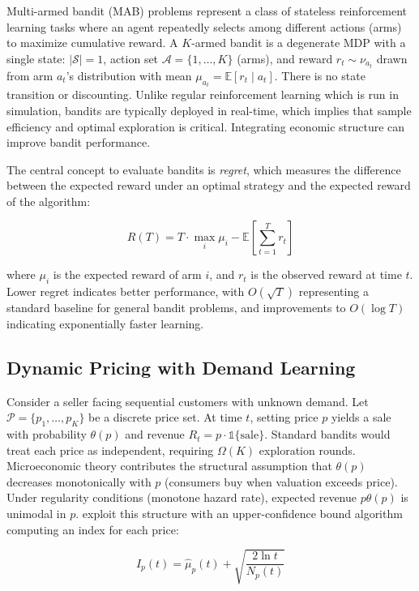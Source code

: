 
Multi-armed bandit (MAB) problems represent a class of stateless reinforcement learning tasks where an agent repeatedly selects among different actions (arms) to maximize cumulative reward. A $K$-armed bandit is a degenerate MDP with a single state: $|\mathcal{S}| = 1$, action set $\mathcal{A} = \{1, \ldots, K\}$ (arms), and reward $r_t \sim \nu_{a_t}$ drawn from arm $a_t$'s distribution with mean $\mu_{a_t} = \mathbb{E}[r_t \mid a_t]$. There is no state transition or discounting. Unlike regular reinforcement learning which is run in simulation, bandits are typically deployed in real-time, which implies that sample efficiency and optimal exploration is critical. Integrating economic structure can improve bandit performance.

The central concept to evaluate bandits is \textit{regret}, which measures the difference between the expected reward under an optimal strategy and the expected reward of the algorithm:

\begin{equation}
R(T) = T \cdot \max_i \mu_i - \mathbb{E}\left[\sum_{t=1}^T r_t\right]
\end{equation}

where $\mu_i$ is the expected reward of arm $i$, and $r_t$ is the observed reward at time $t$. Lower regret indicates better performance, with $O(\sqrt{T})$ representing a standard baseline for general bandit problems, and improvements to $O(\log T)$ indicating exponentially faster learning.

\subsection{Dynamic Pricing with Demand Learning}

Consider a seller facing sequential customers with unknown demand. Let $\mathcal{P} = \{p_1, \ldots, p_K\}$ be a discrete price set. At time $t$, setting price $p$ yields a sale with probability $\theta(p)$ and revenue $R_t = p \cdot \mathbb{1}\{\text{sale}\}$. Standard bandits would treat each price as independent, requiring $\Omega(K)$ exploration rounds. Microeconomic theory contributes the structural assumption that $\theta(p)$ decreases monotonically with $p$ (consumers buy when valuation exceeds price). Under regularity conditions (monotone hazard rate), expected revenue $p\theta(p)$ is unimodal in $p$. \citet{Misra2019} exploit this structure with an upper-confidence bound algorithm computing an index for each price:

\begin{equation}
I_p(t) = \hat{\mu}_p(t) + \sqrt{\frac{2\ln t}{N_p(t)}}
\end{equation}

